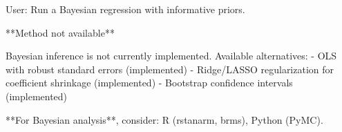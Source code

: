 \begin{Sinput}
User: Run a Bayesian regression with informative priors.
\end{Sinput}

\begin{Soutput}
**Method not available**

Bayesian inference is not currently implemented. Available alternatives:
- OLS with robust standard errors (implemented)
- Ridge/LASSO regularization for coefficient shrinkage (implemented)
- Bootstrap confidence intervals (implemented)

**For Bayesian analysis**, consider: R (rstanarm, brms), Python (PyMC).
\end{Soutput}
